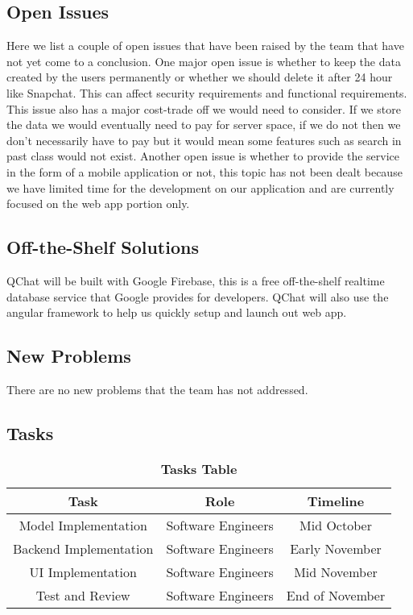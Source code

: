 \documentclass[12pt, titlepage]{article}
\begin{document}
\subsection{Open Issues}
Here we list a couple of open issues that have been raised by the team that have not yet come to a conclusion. One major open issue is whether to keep the data created by the users permanently or whether we should delete it after 24 hour like Snapchat. This can affect security requirements and functional requirements. This issue also has a major cost-trade off we would need to consider. If we store the data we would eventually need to pay for server space, if we do not then we don't necessarily have to pay but it would mean some features such as search in past class would not exist. Another open issue is whether to provide the service in the form of a mobile application or not, this topic has not been dealt because we have limited time for the development on our application and are currently focused on the web app portion only.

\subsection{Off-the-Shelf Solutions}
QChat will be built with Google Firebase, this is a free off-the-shelf realtime database service that Google provides for developers. QChat will also use the angular framework to help us quickly setup and launch out web app.

\subsection{New Problems}
There are no new problems that the team has not addressed.

\subsection{Tasks}

\begin{table}[H]
\centering
\begin{tabular}{|c|c|c|} \hline
 \textbf{Task} & \textbf{Role} &  \textbf{Timeline} \\ \hline
 Model Implementation & Software Engineers & Mid October \\\hline
 Backend Implementation & Software Engineers & Early November \\\hline
 UI Implementation & Software Engineers & Mid November \\\hline
 Test and Review & Software Engineers & End of November \\\hline
\end{tabular}
\caption{\bf Tasks Table}
\label{TeamMemberRoles}
\end{table} 
\end{document}
